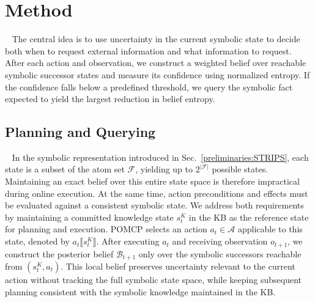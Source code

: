 
\section{Method}~\label{method:method}
The central idea is to use uncertainty in the current symbolic state to decide both when to request external information and what information to request. After each action and observation, we construct a weighted belief over reachable symbolic successor states and measure its confidence using normalized entropy. If the confidence falls below a predefined threshold, we query the symbolic fact expected to yield the largest reduction in belief entropy. 

\subsection{Planning and Querying}~\label{method:overview}\label{method:planning}
In the symbolic representation introduced in Sec.~\ref{preliminaries:STRIPS}, each state is a subset of the atom set $\mathcal{F}$, yielding up to $2^{|\mathcal{F}|}$ possible states. Maintaining an exact belief over this entire state space is therefore impractical during online execution. At the same time, action preconditions and effects must be evaluated against a consistent symbolic state. We address both requirements by maintaining a committed knowledge state $s_t^{K}$ in the KB as the reference state for planning and execution. POMCP selects an action $a_t\in\mathcal{A}$ applicable to this state, denoted by $a_t\llbracket s_t^{K}\rrbracket$. After executing $a_t$ and receiving observation $o_{t+1}$, we construct the posterior belief $\mathcal{B}_{t+1}$ only over the symbolic successors reachable from $(s_t^{K},a_t)$. This local belief preserves uncertainty relevant to the current action without tracking the full symbolic state space, while keeping subsequent planning consistent with the symbolic knowledge maintained in the KB.

